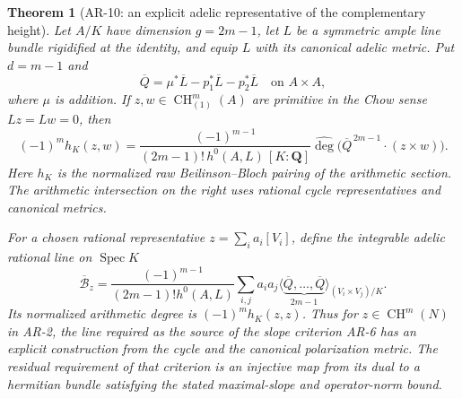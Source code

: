 \documentclass[11pt,a4paper]{article}
\newtheorem{theorem}{Theorem}[section]
\begin{document}
\begin{theorem}[AR-10: an explicit adelic representative of the complementary height]
Let $A/K$ have dimension $g=2m-1$, let $L$ be a symmetric ample line
bundle rigidified at the identity, and equip $L$ with its canonical
adelic metric. Put $d=m-1$ and
\[
 \overline Q=\mu^*\overline L-p_1^*\overline L-p_2^*\overline L
 \quad\text{on }A\times A,
\]
where $\mu$ is addition. If $z,w\in\operatorname{CH}^m_{(1)}(A)$
are primitive in the Chow sense $Lz=Lw=0$, then
\begin{equation}\label{eq:AR10}
 (-1)^m h_K(z,w)=
 \frac{(-1)^{m-1}}{(2m-1)!\,h^0(A,L)\,[K:\mathbf Q]}
 \widehat{\deg}\bigl(\overline Q^{\,2m-1}\cdot(z\times w)\bigr).
\end{equation}
Here $h_K$ is the normalized raw Beilinson--Bloch pairing of the
arithmetic section. The arithmetic intersection on the right uses
rational cycle representatives and canonical metrics.

For a chosen rational representative $z=\sum_i a_i[V_i]$, define the
integrable adelic rational line on $\operatorname{Spec}K$
\[
 \overline{\mathcal B}_z=
 \frac{(-1)^{m-1}}{(2m-1)!h^0(A,L)}
 \sum_{i,j}a_i a_j
 \bigl\langle\underbrace{\overline Q,\ldots,\overline Q}_{2m-1}
 \bigr\rangle_{(V_i\times V_j)/K}.
\]
Its normalized arithmetic degree is $(-1)^m h_K(z,z)$. Thus for
$z\in\operatorname{CH}^m(N)$ in AR-2, the line required as the source
of the slope criterion AR-6 has an explicit construction from the
cycle and the canonical polarization metric. The residual requirement
of that criterion is an injective map from its dual to a hermitian
bundle satisfying the stated maximal-slope and operator-norm bound.
\end{theorem}
\end{document}
